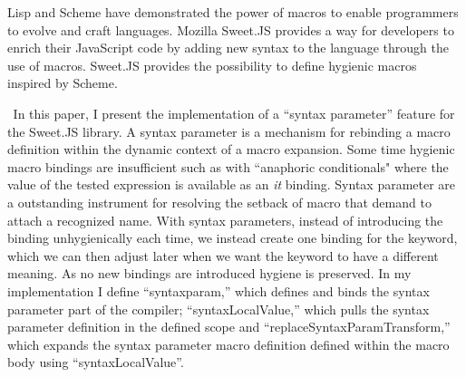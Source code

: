 Lisp and Scheme have demonstrated the power of macros to enable programmers to evolve and craft languages. Mozilla Sweet.JS provides a way for developers to enrich their JavaScript code by adding new syntax to the language through the use of macros. Sweet.JS provides the possibility to define hygienic macros inspired by Scheme.

\textcolor{white}{``}In this paper, I present the implementation of a ``syntax parameter'' feature for the Sweet.JS library. A syntax parameter is a mechanism for rebinding a macro definition within the dynamic context of a macro expansion. Some time hygienic macro bindings are insufficient such as with ``anaphoric conditionals" where the value of the tested expression is available as an {\it it} binding. Syntax parameter are a outstanding instrument for resolving the setback of macro that demand to attach a recognized name. With syntax parameters, instead of introducing the binding unhygienically each time, we instead create one binding for the keyword, which we can then adjust later when we want the keyword to have a different meaning. As no new bindings are introduced hygiene is preserved. In my implementation I define ``syntaxparam,'' which defines and binds the syntax parameter part of the compiler; ``syntaxLocalValue,'' which pulls the syntax parameter definition in the defined scope and ``replaceSyntaxParamTransform,'' which expands the syntax parameter macro definition defined within the macro body using ``syntaxLocalValue''.\textcolor{white}{"}